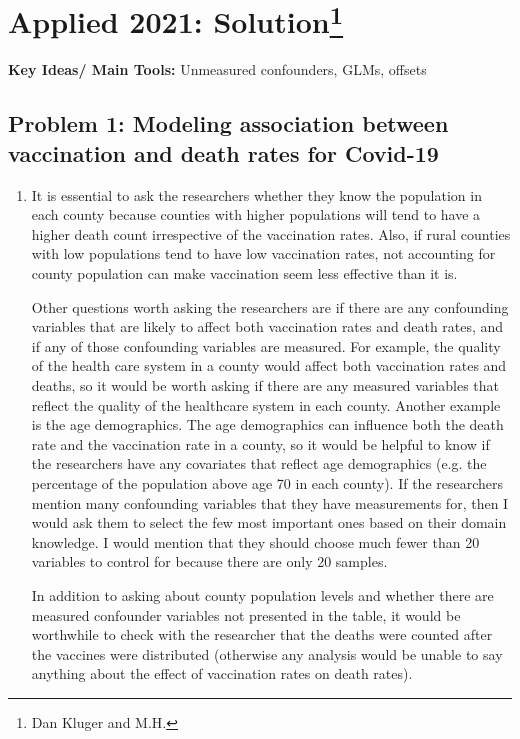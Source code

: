 \section{Applied 2021: Solution\footnote{Dan Kluger and M.H.}}

\textbf{Key Ideas/ Main Tools:} Unmeasured confounders, GLMs, offsets

\subsection*{Problem 1: Modeling association between vaccination and death rates for Covid-19}

\begin{enumerate}[label=(\alph*)]
\item It is essential to ask the researchers whether they know the population in each county because counties with higher populations will tend to have a higher death count irrespective of the vaccination rates. Also, if rural counties with low populations tend to have low vaccination rates, not accounting for county population can make vaccination seem less effective than it is.

Other questions worth asking the researchers are if there are any confounding variables that are likely to affect both vaccination rates and death rates, and if any of those confounding variables are measured. For example, the quality of the health care system in a county would affect both vaccination rates and deaths, so it would be worth asking if there are any measured variables that reflect the quality of the healthcare system in each county. Another example is the age demographics. The age demographics can influence both the death rate and the vaccination rate in a county, so it would be helpful to know if the researchers have any covariates that reflect age demographics (e.g. the percentage of the population above age 70 in each county). If the researchers mention many confounding variables that they have measurements for, then I would ask them to select the few most important ones based on their domain knowledge. I would mention that they should choose much fewer than 20 variables to control for because there are only 20 samples.  

In addition to asking about county population levels and whether there are measured confounder variables not presented in the table, it would be worthwhile to check with the researcher that the deaths were counted after the vaccines were distributed (otherwise any analysis would be unable to say anything about the effect of vaccination rates on death rates). 



\end{enumerate}
